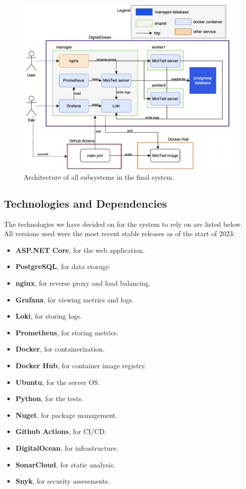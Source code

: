 \begin{figure}[H]
    \centering
    \includegraphics[width=\textwidth]{images/architecture2.png}
    \caption{Architecture of all subsystems in the final system.}
    \label{fig:architecture}
\end{figure}

\subsection{Technologies and Dependencies}

The technologies we have decided on for the system to rely on are listed below. All versions used were the most recent stable releases as of the start of 2023:

\begin{itemize}
    \item \textbf{ASP.NET Core}, for the web application.
    \item \textbf{PostgreSQL}, for data storage.
    \item \textbf{nginx}, for reverse proxy and load balancing.
    \item \textbf{Grafana}, for viewing metrics and logs.
    \item \textbf{Loki}, for storing logs.
    \item \textbf{Prometheus}, for storing metrics.
    \item \textbf{Docker}, for containerization.
    \item \textbf{Docker Hub}, for container image registry.
    \item \textbf{Ubuntu}, for the server OS.
    \item \textbf{Python}, for the tests.
    \item \textbf{Nuget}, for package management.
    \item \textbf{Github Actions}, for CI/CD.
    \item \textbf{DigitalOcean}, for infrastructure.
    \item \textbf{SonarCloud}, for static analysis.
    \item \textbf{Snyk}, for security assessments. \\
\end{itemize}

